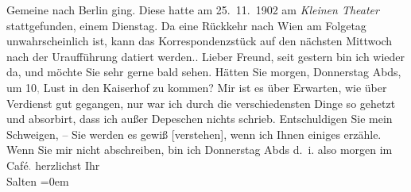 \begin{ledgroupsized}[t]{13cm}
{{{{{                           Gemeine} nach Berlin ging. Diese
                        hatte am 25. 11. 1902 am \emph{Kleinen Theater} stattgefunden, einem Dienstag. Da
                        eine Rückkehr nach Wien am Folgetag
                        unwahrscheinlich ist, kann das Korrespondenzstück auf den nächsten Mittwoch nach der Uraufführung datiert
                        werden.}}}\label{K_L03337-1h}.}\pend
           \pstart
           Lieber Freund, seit gestern bin ich
               wieder da, und möchte Sie sehr gerne bald sehen. Hätten Sie morgen, Donnerstag{ }Abds, um 10\textcolor{gray}{,} Lust in den Kaiserhof zu
               kommen? Mir ist es über Erwarten, wie über Verdienst gut gegangen, nur war ich durch
               die verschiedensten Dinge so gehetzt und absorbirt, dass ich außer Depeschen nichts
               schrieb.\pend
           \pstart
           Entschuldigen Sie mein Schweigen, – Sie werden es
               gewiß {[}verstehen{]}, wenn ich Ihnen einiges erzähle. Wenn Sie mir
               nicht abschreiben, bin ich Donnerstag{ }Abds d. i. also morgen im Café\textcolor{gray}{.}\pend
           \pstart
           herzlichst Ihr {\\[\baselineskip]}\spacefill\mbox{Salten}\pend
           \leftskip=0em{}
         
         \endnumbering{}\end{ledgroupsized}  \newcommand{\dateiname}{L03337}\newcommand{\titel}{Felix Salten an Arthur Schnitzler, [3. 12.? 1902]}\newcommand{\editorInnen}{Martin Anton Müller und Laura Untner}
      